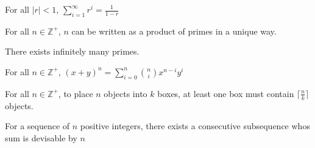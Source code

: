 \begin{theorem}
	For all $|r| < 1$, $\sum_{i=1}^\infty r^i = \frac{1}{1-r}$
\end{theorem}

\begin{theorem}
	For all $n\in \mathbb{Z}^+$, $n$ can be written as a product of primes in a unique way.
\end{theorem}

\begin{theorem}
	There exists infinitely many primes.
\end{theorem}

\begin{theorem}
	For all $n\in \mathbb{Z}^+$, $(x+y)^n = \sum_{i=0}^n \binom{n}{i} x^{n-i}y^i$
\end{theorem}

\begin{theorem}
	For all $n\in \mathbb{Z}^+$, to place $n$ objects into $k$ boxes, at least one box must contain $\lceil \frac{n}{k} \rceil$ objects.
\end{theorem}

\begin{theorem}
	For a sequence of $n$ positive integers, there exists a consecutive subsequence whos sum is devisable by $n$
\end{theorem}
